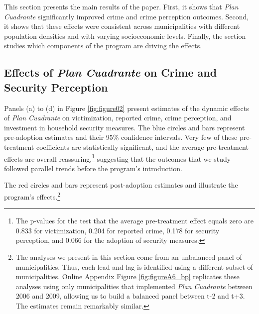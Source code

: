﻿This section presents the main results of the paper. First, it shows that \emph{Plan Cuadrante} significantly improved crime and crime perception outcomes. Second, it shows that these effects were consistent across municipalities with different population densities and with varying socioeconomic levels. Finally, the section studies which components of the program are driving the effects. 

\subsection{Effects of \emph{Plan Cuadrante} on Crime and Security Perception}
\label{main_results}

Panels (a) to (d) in Figure \ref{fig:figure02} present estimates of the dynamic effects of \emph{Plan Cuadrante} on victimization, reported crime, crime perception, and investment in household security measures. The blue circles and bars represent pre-adoption estimates and their 95\% confidence intervals. Very few of these pre-treatment coefficients are statistically significant, and the average pre-treatment effects are overall reassuring,\footnote{The p-values for the test that the average pre-treatment effect equals zero are 0.833 for victimization, 0.204 for reported crime, 0.178 for security perception, and 0.066 for the adoption of security measures.} suggesting that the outcomes that we study followed parallel trends before the program's introduction.%
 

\FloatBarrier

\FloatBarrier

The red circles and bars represent post-adoption estimates and illustrate the program's effects.\footnote{The analyses we present in this section come from an unbalanced panel of municipalities. Thus, each lead and lag is identified using a different subset of municipalities. Online Appendix Figure \ref{fig:figureA6_bp} replicates these analyses using only municipalities that implemented \emph{Plan Cuadrante} between 2006 and 2009, allowing us to build a balanced panel between t-2 and t+3. The estimates remain remarkably similar.}

